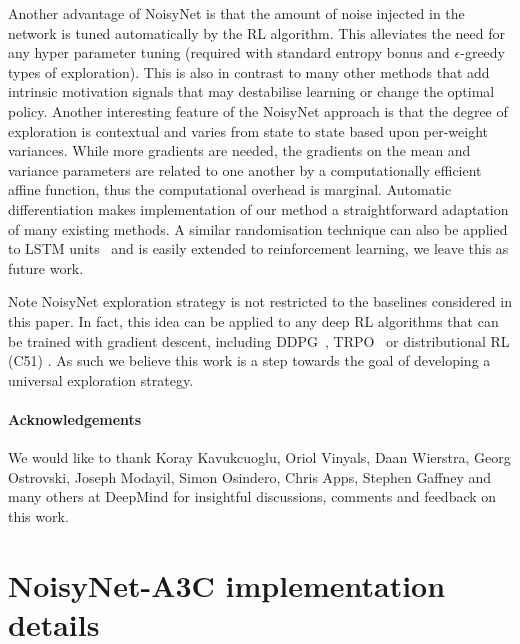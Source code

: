 \documentclass{article}
\newcommand{\algoinit}{NoisyNet}
\begin{document}
Another advantage of NoisyNet is that the amount of noise injected in the network is tuned automatically by the RL algorithm. This alleviates the need for any hyper parameter tuning (required with standard entropy bonus and $\epsilon$-greedy types of exploration). 
This is also in contrast to many other methods that add intrinsic motivation signals that may destabilise learning or change the optimal policy. 
Another interesting feature of the \algoinit{} approach is that the degree of exploration is contextual and varies from state to state based upon per-weight variances.
While more gradients are needed, the gradients on the mean and variance parameters are related to one another by a computationally efficient affine function, thus the computational overhead is marginal.
Automatic differentiation makes implementation of our method a straightforward adaptation of many existing methods.
A similar randomisation technique can also be applied to LSTM units~\citep{fortunato2017bayesian} and is easily extended to reinforcement learning, we leave this as future work.

Note \algoinit{} exploration strategy is not restricted to the baselines considered in this paper. In fact, this idea can be applied to any deep RL algorithms that can be trained with gradient descent, including DDPG~\citep{lillicrap2015continuous}, TRPO~\citep{schulman2015trust} or distributional RL (C51) \citep{bellemare2017distributional}. As such we believe this work is a step towards the goal of developing a universal exploration strategy. 

\paragraph{Acknowledgements}
We would like to thank Koray Kavukcuoglu, Oriol Vinyals,  Daan Wierstra, Georg Ostrovski, Joseph Modayil, Simon Osindero, Chris Apps, Stephen Gaffney and many others at DeepMind for insightful discussions, comments and feedback on this work.



\newpage
\appendix

\section{\algoinit{}-A3C implementation details}
\end{document}
